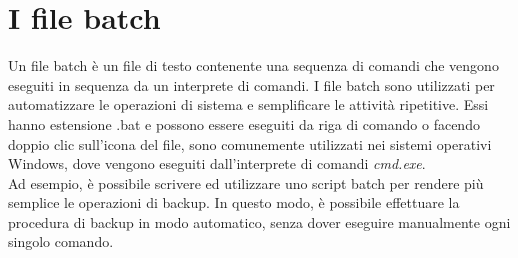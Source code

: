 \documentclass[12pt]{report}
\begin{document}
	\section{I file batch}
	Un file batch è un file di testo contenente una sequenza di comandi che vengono eseguiti in sequenza da un interprete di comandi. I file batch sono utilizzati per automatizzare le operazioni di sistema e semplificare le attività ripetitive. Essi hanno estensione .bat e possono essere eseguiti da riga di comando o facendo doppio clic sull'icona del file, sono comunemente utilizzati nei sistemi operativi Windows, dove vengono eseguiti dall'interprete di comandi \textit{cmd.exe}.
	\vspace{\baselineskip}\\
	Ad esempio, è possibile scrivere ed utilizzare uno script batch per rendere più semplice le operazioni di backup. In questo modo, è possibile effettuare la procedura di backup in modo automatico, senza dover eseguire manualmente ogni singolo comando.
\end{document}
